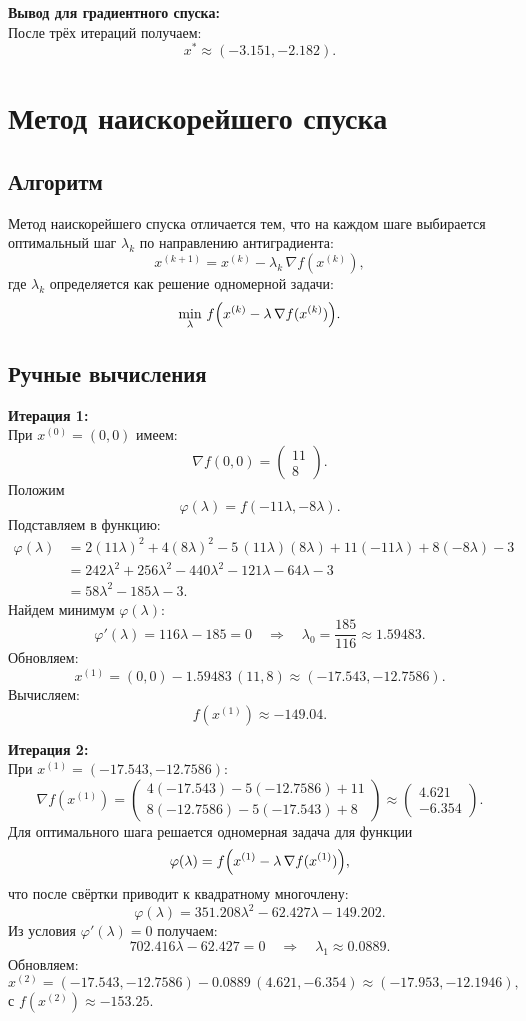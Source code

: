 \documentclass{article}
\begin{document}
\medskip
\textbf{Вывод для градиентного спуска:}\\
После трёх итераций получаем:
\[
x^*\approx(-3.151,-2.182).
\]

\section{Метод наискорейшего спуска}
\subsection{Алгоритм}
Метод наискорейшего спуска отличается тем, что на каждом шаге выбирается оптимальный шаг \(\lambda_k\) по направлению антиградиента:
\[
x^{(k+1)}=x^{(k)}-\lambda_k\,\nabla f(x^{(k)}),
\]
где \(\lambda_k\) определяется как решение одномерной задачи:
\[
\min_{\lambda}\, f\Bigl(x^{(k)}-\lambda\,\nabla f(x^{(k)})\Bigr).
\]

\subsection{Ручные вычисления}
\textbf{Итерация 1:}\\
При \(x^{(0)}=(0,0)\) имеем:
\[
\nabla f(0,0)=
\begin{pmatrix}
11\\
8
\end{pmatrix}.
\]
Положим
\[
\varphi(\lambda)=f(-11\lambda,-8\lambda).
\]
Подставляем в функцию:
\begin{align*}
\varphi(\lambda)&=2(11\lambda)^2+4(8\lambda)^2-5\,(11\lambda)(8\lambda)+11(-11\lambda)+8(-8\lambda)-3\\[1mm]
&=242\lambda^2+256\lambda^2-440\lambda^2-121\lambda-64\lambda-3\\[1mm]
&=58\lambda^2-185\lambda-3.
\end{align*}
Найдем минимум \(\varphi(\lambda)\):
\[
\varphi'(\lambda)=116\lambda-185=0\quad\Longrightarrow\quad \lambda_0=\frac{185}{116}\approx1.59483.
\]
Обновляем:
\[
x^{(1)}=(0,0)-1.59483\,(11,8)\approx(-17.543,-12.7586).
\]
Вычисляем:
\[
f(x^{(1)})\approx-149.04.
\]

\medskip
\textbf{Итерация 2:}\\
При \(x^{(1)}=(-17.543,-12.7586)\):
\[
\nabla f(x^{(1)})=\begin{pmatrix}
4(-17.543)-5(-12.7586)+11\\[1mm]
8(-12.7586)-5(-17.543)+8
\end{pmatrix}\approx
\begin{pmatrix}
4.621\\[1mm]
-6.354
\end{pmatrix}.
\]
Для оптимального шага решается одномерная задача для функции
\[
\varphi(\lambda)=f\Bigl(x^{(1)}-\lambda\,\nabla f(x^{(1)})\Bigr),
\]
что после свёртки приводит к квадратному многочлену:
\[
\varphi(\lambda)=351.208\lambda^2-62.427\lambda-149.202.
\]
Из условия \(\varphi'(\lambda)=0\) получаем:
\[
702.416\lambda-62.427=0\quad\Longrightarrow\quad \lambda_1\approx0.0889.
\]
Обновляем:
\[
x^{(2)}=(-17.543,-12.7586)-0.0889\,(4.621,-6.354)\approx(-17.953,-12.1946),
\]
с \(f(x^{(2)})\approx-153.25\).
\end{document}

